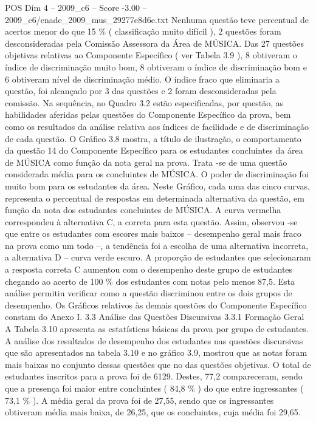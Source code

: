 \begin{textsample}{POS Dim 4 – 2009\_c6 – Score -3.00 – 2009\_c6/enade\_2009\_mus\_29277e8d6e.txt}
Nenhuma questão teve percentual de acertos menor do que 15 \% ( classificação muito difícil ), 2 questões foram desconsideradas pela Comissão Assessora da Área de MÚSICA.
Das 27 questões objetivas relativas ao Componente Específico ( ver Tabela 3.9 ), 8 obtiveram o índice de discriminação muito bom, 8 obtiveram o índice de discriminação bom e 6 obtiveram nível de discriminação médio.
O índice fraco que eliminaria a questão, foi alcançado por 3 das questões e 2 foram desconsideradas pela comissão.
Na sequência, no Quadro 3.2 estão especificadas, por questão, as habilidades aferidas pelas questões do Componente Específico da prova, bem como os resultados da análise relativa aos índices de facilidade e de discriminação de cada questão.
O Gráfico 3.8 mostra, a título de ilustração, o comportamento da questão 14 do Componente Específico para os estudantes concluintes da área de MÚSICA como função da nota geral na prova.
Trata -se de uma questão considerada média para os concluintes de MÚSICA.
O poder de discriminação foi muito bom para os estudantes da área.
Neste Gráfico, cada uma das cinco curvas, representa o percentual de respostas em determinada alternativa da questão, em função da nota dos estudantes concluintes de MÚSICA.
A curva vermelha correspondeu à alternativa C, a correta para esta questão.
Assim, observou -se que entre os estudantes com escores mais baixos – desempenho geral mais fraco na prova como um todo –, a tendência foi a escolha de uma alternativa incorreta, a alternativa D – curva verde escuro.
A proporção de estudantes que selecionaram a resposta correta C aumentou com o desempenho deste grupo de estudantes chegando ao acerto de 100 \% dos estudantes com notas pelo menos 87,5.
Esta análise permitiu verificar como a questão discriminou entre os dois grupos de desempenho.
Os Gráficos relativos às demais questões do Componente Específico constam do Anexo I. 3.3 Análise das Questões Discursivas 3.3.1 Formação Geral A Tabela 3.10 apresenta as estatísticas básicas da prova por grupo de estudantes.
A análise dos resultados de desempenho dos estudantes nas questões discursivas que são apresentados na tabela 3.10 e no gráfico 3.9, mostrou que as notas foram mais baixas no conjunto dessas questões que no das questões objetivas.
O total de estudantes inscritos para a prova foi de 6129.
Destes, 77,2 compareceram, sendo que a presença foi maior entre concluintes ( 84,8 \% ) do que entre ingressantes ( 73,1 \% ).
A média geral da prova foi de 27,55, sendo que os ingressantes obtiveram média mais baixa, de 26,25, que os concluintes, cuja média foi 29,65.

\end{textsample}
